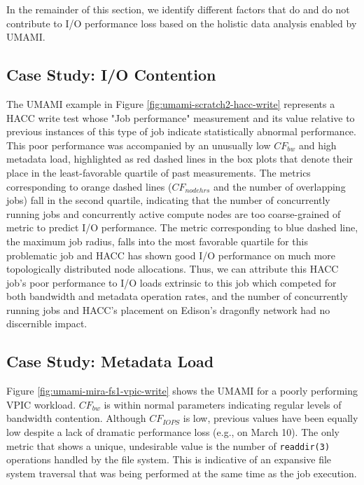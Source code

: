 In the remainder of this section, we identify different factors that do and do not contribute to I/O performance loss based on the holistic data analysis enabled by UMAMI.


\subsection{Case Study: I/O Contention}

The UMAMI example in Figure \ref{fig:umami-scratch2-hacc-write} represents a HACC write test whose "Job performance" measurement and its value relative to previous instances of this type of job indicate statistically abnormal performance.
This poor performance was accompanied by an unusually low $\mathit{CF}_{\mathit{bw}}$ and high metadata load, highlighted as red dashed lines in the box plots that denote their place in the least-favorable quartile of past measurements.
The metrics corresponding to orange dashed lines ($\mathit{CF}_{\mathit{nodehrs}}$ and the number of overlapping jobs) fall in the second quartile, indicating that the number of concurrently running jobs and concurrently active compute nodes are too coarse-grained of metric to predict I/O performance.
The metric corresponding to blue dashed line, the maximum job radius, falls into the most favorable quartile for this problematic job and HACC has shown good I/O performance on much more topologically distributed node allocations.
Thus, we can attribute this HACC job's poor performance to I/O loads extrinsic to this job which competed for both bandwidth and metadata operation rates, and the number of concurrently running jobs and HACC's placement on Edison's dragonfly network had no discernible impact.

\subsection{Case Study: Metadata Load}

Figure \ref{fig:umami-mira-fs1-vpic-write} shows the UMAMI for a poorly performing VPIC workload.
$\mathit{CF}_{\mathit{bw}}$ is within normal parameters indicating regular levels of bandwidth contention.
Although $\mathit{CF}_{\mathit{IOPS}}$ is low, previous values have been equally low despite a lack of dramatic performance loss (e.g., on March 10).
The only metric that shows a unique, undesirable value is the number of \texttt{readdir(3)} operations handled by the file system.
This is indicative of an expansive file system traversal that was being performed at the same time as the job execution.

